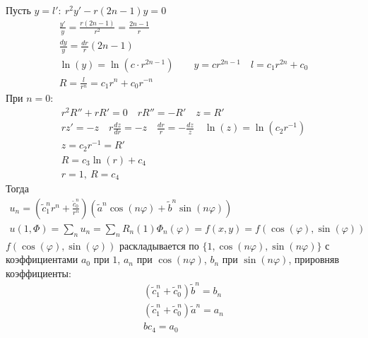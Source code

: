 	Пусть $y = l':\ r^2 y' - r(2n-1) y = 0$
	\begin{gather*}
		\frac{y'}{y} = \frac{r(2n-1)}{r^2} = \frac{2n-1}{r}\\
		\frac{dy}{y} = \frac{dr}{r}(2n-1)\\
		\ln(y) = \ln(c \cdot r^{2n-1})\qquad y = c r^{2n-1}\quad l = c_{1} r^{2n} + c_{0}\\
		R = \frac{l}{r^{n}} = c_{1} r^{n} + c_{0} r^{-n}
	\end{gather*}
	При $n = 0:$
	\begin{gather*}
		r^2 R'' + rR' = 0\quad rR'' = -R'\quad z = R'\\
		rz'= -z\quad r \frac{dz}{dr} = -z\quad \frac{dr}{r} = -\frac{dz}{z}\quad \ln(z) = \ln(c_{2}r^{-1})\\
		z = c_{2} r^{-1} = R'\\
		R = c_{3} \ln(r) + c_{4}\\
		r = 1,\ R = c_{4}
	\end{gather*}
	Тогда
	\begin{gather*}
		u_{n} = (\tilde{c}_{1}^{n} r^{n} + \frac{\tilde{c}_{0}^{n}}{r^{n}}) (\tilde{a}^{n} \cos(n \varphi) + \tilde{b}^{n} \sin(n \varphi))\\
		u(1, \Phi) = \sum\limits_{n} u_{n} = \sum\limits_{n} R_{n}(1) \Phi_{n}(\varphi) = f(x,y) = f(\cos(\varphi),\sin(\varphi))
	\end{gather*}
	$f(\cos(\varphi),\sin(\varphi))$ раскладывается по $\{1, \cos(n\varphi), \sin(n \varphi)\}$ с коэффициентами $a_0$ при $1$, $a_{n}$ при $\cos(n \varphi)$, $b_{n}$ при $\sin(n \varphi)$, прировняв коэффициенты:
	\begin{gather*}
		(\tilde{c}_{1}^{n} + \tilde{c}_{0}^{n}) \tilde{b}^{n} = b_{n}\\
		(\tilde{c}_{1}^{n} + \tilde{c}_{0}^{n}) \tilde{a}^{n} = a_{n}\\
		b c_{4} = a_{0}
	\end{gather*}
\vskip 0.4in

